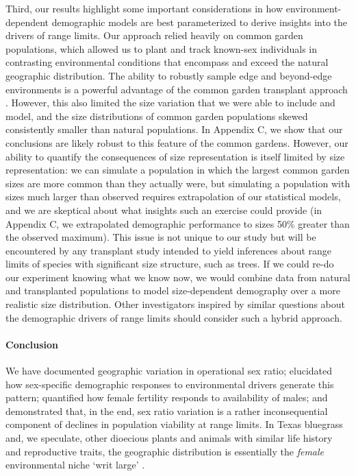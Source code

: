 \documentclass[11pt]{article}\usepackage[]{graphicx}\usepackage[]{color}
\begin{document}
Third, our results highlight some important considerations in how environment-dependent demographic models are best parameterized to derive insights into the drivers of range limits. 
Our approach relied heavily on common garden populations, which allowed us to plant and track known-sex individuals in contrasting environmental conditions that encompass and exceed the natural geographic distribution. 
The ability to robustly sample edge and beyond-edge environments is a powerful advantage of the common garden transplant approach \citep{hargreaves2013species}. 
However, this also limited the size variation that we were able to include and model, and the size distributions of common garden populations skewed consistently smaller than natural populations.
In Appendix C, we show that our conclusions are likely robust to this feature of the common gardens.
However, our ability to quantify the consequences of size representation is itself limited by size representation: we can simulate a population in which the largest common garden sizes are more common than they actually were, but simulating a population with sizes much larger than observed requires extrapolation of our statistical models, and we are skeptical about what insights such an exercise could provide (in Appendix C, we extrapolated demographic performance to sizes 50\% greater than the observed maximum). 
This issue is not unique to our study but will be encountered by any transplant study intended to yield inferences about range limits of species with significant size structure, such as trees.
If we could re-do our experiment knowing what we know now, we would combine data from natural and transplanted populations to model size-dependent demography over a more realistic size distribution.
Other investigators inspired by similar questions about the demographic drivers of range limits should consider such a hybrid approach.

\paragraph{Conclusion}
We have documented geographic variation in operational sex ratio; elucidated how sex-specific demographic responses to environmental drivers generate this pattern; quantified how female fertility responds to availability of males; and demonstrated that, in the end, sex ratio variation is a rather inconsequential component of declines in population viability at range limits. 
In Texas bluegrass and, we speculate, other dioecious plants and animals with similar life history and reproductive traits, the geographic distribution is essentially the \textit{female} environmental niche `writ large' \citep{hargreaves2013species}. 
\end{document}
